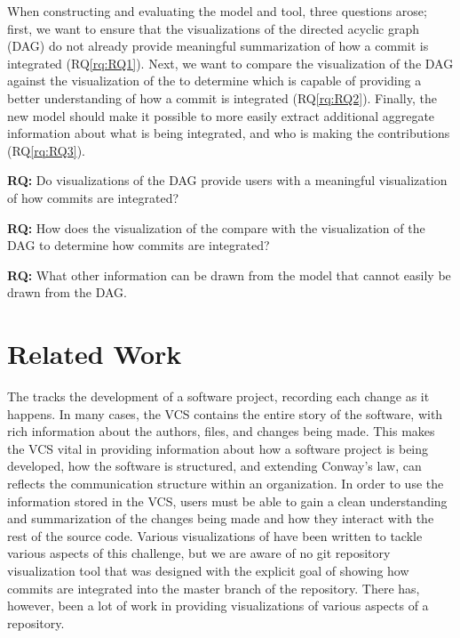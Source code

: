 When constructing and evaluating the model and tool, three questions
arose; first, we want to ensure that the visualizations of the directed
acyclic graph (DAG) do not already provide meaningful summarization of
how a commit is integrated (RQ\ref{rq:RQ1}). Next, we want to compare
the visualization of the DAG against the visualization of the \mt{} to
determine which is capable of providing a better understanding of how a
commit is integrated (RQ\ref{rq:RQ2}). Finally, the new model should
make it possible to more easily extract additional aggregate information
about what is being integrated, and who is making the contributions
(RQ\ref{rq:RQ3}).

\begin{textbox}
  \textbf{RQ:} Do visualizations of the DAG provide
  users with a meaningful visualization of how commits are integrated?
\end{textbox}


\begin{textbox}
  \textbf{RQ:} How does the visualization of the \mt{}
  compare with the visualization of the DAG to determine how commits are
  integrated?
\end{textbox}

\begin{textbox}
  \textbf{RQ:} What other information can be drawn from the
  \mt{} model that cannot easily be drawn from the DAG.
\end{textbox}


\section{Related Work}\label{sec:related_work}

The  tracks the development of a
software project, recording each change as it happens. In many cases,
the VCS contains the entire story of the software, with rich information
about the authors, files, and changes being made. This makes the VCS
vital in providing information about how a software project is being
developed, how the software is structured, and extending Conway's law,
can reflects the communication structure within an organization. In
order to use the information stored in the VCS, users must be able to
gain a clean understanding and summarization of the changes being made
and how they interact with the rest of the source code. Various
visualizations of have been written to tackle various aspects of this
challenge, but we are aware of no git repository visualization tool that
was designed with the explicit goal of showing how commits are
integrated into the master branch of the repository. There has, however,
been a lot of work in providing visualizations of various aspects of a
repository.

